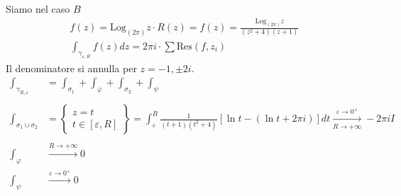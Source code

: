 Siamo nel caso $B$
\begin{gather*}
f\left( z\right) =\mathrm{Log}_{\left( 2\pi \right)} z\cdotp R\left( z\right) =f\left( z\right) =\frac{\mathrm{Log}_{\left( 2\pi \right)} z}{\left( z^{2} +4\right)\left( z+1\right)}\\
\int _{\gamma _{\varepsilon ,R}} f\left( z\right) dz=2\pi i\cdotp \sum \mathrm{Res}\left( f,z_{i}\right)
\end{gather*}
Il denominatore si annulla per $z=-1,\pm 2i$.
\begin{equation*}
\begin{aligned}
\int _{\gamma _{R,\varepsilon }} & =\int _{\sigma _{1}} +\int _{\varphi } +\int _{\sigma _{2}} +\int _{\psi }\\
 & \\
\int _{\sigma _{1} \cup \sigma _{2}} & =\left\{\begin{array}{ c }
z=t\\
t\in \left[ \varepsilon ,R\right]
\end{array}\right\} =\int ^{R}_{\varepsilon }\frac{1}{\left( t+1\right)\left( t^{2} +4\right)}\left[\ln t-\left(\ln t+2\pi i\right)\right] dt\xrightarrow[R\rightarrow +\infty ]{\varepsilon \rightarrow 0^{+}} -2\pi iI\\
 & \\
\int _{\varphi } & \xrightarrow{R\rightarrow +\infty } 0\\
\int _{\psi } & \xrightarrow{\varepsilon \rightarrow 0^{+}} 0
\end{aligned}
\end{equation*}
\Soluzione

